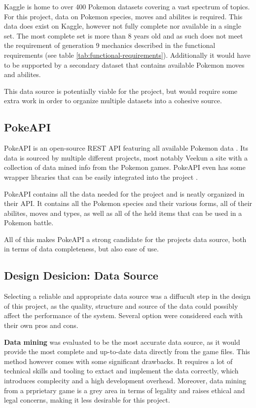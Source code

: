 Kaggle is home to over 400 Pokemon datasets \cite{PokemonKaggleDataSets} covering a vast spectrum of topics. For this project, data on Pokemon species,
moves and abilites is required. This data does exist on Kaggle, however not fully complete nor available in a single set. The most complete set \cite{PokemonDataSetWithStats} is 
more than 8 years old and as such does not meet the requirement of generation 9 mechanics described in the functional requirements (see table \ref{tab:functional-requirements}).
Additionally it would have to be supported by a secondary dataset that contains available Pokemon moves and abilites.

This data source is potentially viable for the project, but would require some extra work in order to organize multiple datasets into a cohesive source.

\subsection{PokeAPI}
PokeAPI is an open-source REST API featuring all available Pokemon data \cite{PokeAPI}. Its data is sourced by multiple different projects, most notably 
Veekun \cite{Veekun} a site with a collection of data mined info from the Pokemon games. PokeAPI even has some wrapper libraries that can be easily integrated
into the project \cite{PokeAPIWrapperLibs}. 

PokeAPI contains all the data needed for the project and is neatly organized in their API. It contains all the Pokemon species and their various forms, 
all of their abilites, moves and types, as well as all of the held items that can be used in a Pokemon battle. 

All of this makes PokeAPI a strong candidate for the projects data source, both in terms of data completeness, but also ease of use.


\subsection{Design Desicion: Data Source}
Selecting a reliable and appropriate data source was a diffucult step in the design
of this project, as the quality, structure and source of the data could possibly 
affect the performance of the system. Several option were considered each with their
own pros and cons.

\textbf{Data mining} was evaluated to be the most accurate data source, as it would
provide the most complete and up-to-date data directly from the game files. This method
however comes with some significant drawbacks. It requires a lot of technical skills and tooling
to extact and implement the data correctly, which introduces complecity and a high development overhead.
Moreover, data mining from a prprietary game is a grey area in terms of legality and raises ethical 
and legal concerns, making it less desirable for this project.

